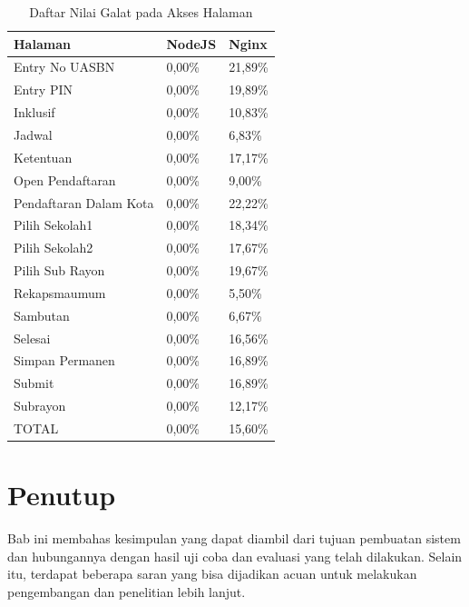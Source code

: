 \documentclass{ta-its}
\begin{document}
					\begin{longtable}{|p{}|p{0.2\textwidth}|p{}|} %
						
						\caption{Daftar Nilai Galat pada Akses Halaman} \label{tabelGalat} \\
						\hline
						\textbf{Halaman} & \textbf{NodeJS} & \textbf{Nginx} \\ \hline
						
						\endhead
						\endfoot
						\endlastfoot
						
						Entry No UASBN & 0,00\% & 21,89\% \\ \hline
						Entry PIN & 0,00\% & 19,89\% \\ \hline
						Inklusif & 0,00\% & 10,83\% \\ \hline
						Jadwal & 0,00\% & 6,83\% \\ \hline
						Ketentuan & 0,00\% & 17,17\% \\ \hline
						Open Pendaftaran & 0,00\% & 9,00\% \\ \hline
						Pendaftaran Dalam Kota & 0,00\% & 22,22\% \\ \hline
						Pilih Sekolah1 & 0,00\% & 18,34\% \\ \hline
						Pilih Sekolah2 & 0,00\% & 17,67\% \\ \hline
						Pilih Sub Rayon & 0,00\% & 19,67\% \\ \hline
						Rekapsmaumum & 0,00\% & 5,50\% \\ \hline
						Sambutan & 0,00\% & 6,67\% \\ \hline
						Selesai & 0,00\% & 16,56\% \\ \hline
						Simpan Permanen & 0,00\% & 16,89\% \\ \hline
						Submit & 0,00\% & 16,89\% \\ \hline
						Subrayon & 0,00\% & 12,17\% \\ \hline
						TOTAL & 0,00\% & 15,60\% \\ \hline
						
					\end{longtable}
					
		\chapter{Penutup}
			Bab ini membahas kesimpulan yang dapat diambil dari tujuan pembuatan sistem dan hubungannya dengan hasil uji coba dan evaluasi yang telah dilakukan. Selain itu, terdapat beberapa saran yang bisa dijadikan acuan untuk melakukan pengembangan dan penelitian lebih lanjut.
			
\end{document}
